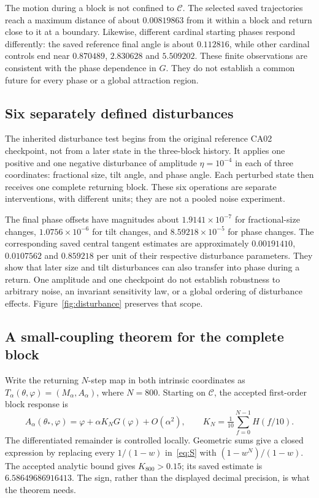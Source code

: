 \documentclass[11pt,a4paper]{article}
\numberwithin{equation}{section}
\newcommand{\Cset}{\mathcal C}
\begin{document}
The motion during a block is not confined to $\Cset$. The selected saved trajectories reach a maximum distance of about $0.00819863$ from it within a block and return close to it at a boundary. Likewise, different cardinal starting phases respond differently: the saved reference final angle is about $0.112816$, while other cardinal controls end near $0.870489$, $2.830628$ and $5.509202$. These finite observations are consistent with the phase dependence in $G$. They do not establish a common future for every phase or a global attraction region.


\subsection{Six separately defined disturbances}
The inherited disturbance test begins from the original reference CA02 checkpoint, not from a later state in the three-block history. It applies one positive and one negative disturbance of amplitude $\eta=10^{-4}$ in each of three coordinates: fractional size, tilt angle, and phase angle. Each perturbed state then receives one complete returning block. These six operations are separate interventions, with different units; they are not a pooled noise experiment.

The final phase offsets have magnitudes about $1.9141\times10^{-7}$ for fractional-size changes, $1.0756\times10^{-6}$ for tilt changes, and $8.59218\times10^{-5}$ for phase changes. The corresponding saved central tangent estimates are approximately $0.00191410$, $0.0107562$ and $0.859218$ per unit of their respective disturbance parameters. They show that later size and tilt disturbances can also transfer into phase during a return. One amplitude and one checkpoint do not establish robustness to arbitrary noise, an invariant sensitivity law, or a global ordering of disturbance effects. Figure~\ref{fig:disturbance} preserves that scope.


\subsection{A small-coupling theorem for the complete block}
Write the returning $N$-step map in both intrinsic coordinates as $T_\alpha(\theta,\varphi)=(M_\alpha,A_\alpha)$, where $N=800$. Starting on $\Cset$, the accepted first-order block response is
\begin{equation}\label{eq:blockfirst}
A_\alpha(\theta_*,\varphi)=\varphi+\alpha K_NG(\varphi)+O(\alpha^2),\qquad
K_N=\tfrac1{10}\sum_{f=0}^{N-1}H(f/10).
\end{equation}
The differentiated remainder is controlled locally. Geometric sums give a closed expression by replacing every $1/(1-w)$ in~\eqref{eq:S} with $(1-w^N)/(1-w)$. The accepted analytic bound gives $K_{800}>0.15$; its saved estimate is $6.58649686916413$. The sign, rather than the displayed decimal precision, is what the theorem needs.
\end{document}
